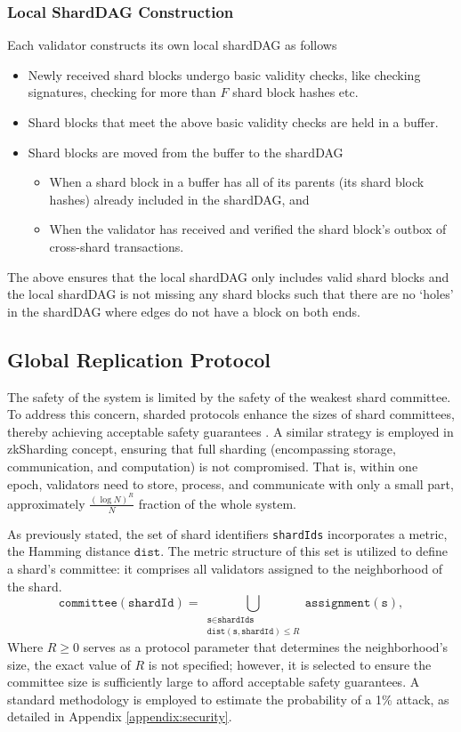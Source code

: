 \subsubsection{Local ShardDAG Construction}
Each validator constructs its own local shardDAG as follows
\begin{itemize}
	\item Newly received shard blocks undergo basic validity checks, like checking signatures, checking for more than $F$ shard block hashes etc.
	\item Shard blocks that meet the above basic validity checks are held in a buffer.
	\item Shard blocks are moved from the buffer to the shardDAG 
	\begin{itemize}
		\item When a shard block in a buffer has all of its parents (its shard block hashes) already included in the shardDAG, and 
		\item When the validator has received and verified the shard block's outbox of cross-shard transactions.	
	\end{itemize}
\end{itemize} 
The above ensures that the local shardDAG only includes valid shard blocks and the local shardDAG is not missing any shard blocks such that there are no `holes' in the shardDAG where edges do not have a block on both ends.





\subsection{Global Replication Protocol}
\label{section:global-consensus}

The safety of the system is limited by the safety of the weakest shard committee. 
To address this concern, sharded protocols enhance the sizes of shard committees, 
 thereby achieving acceptable safety guarantees \cite{RapidChain,OmniLedger}.
A similar strategy is employed in zkSharding concept, ensuring that full sharding (encompassing storage, communication, and computation) is not compromised.
That is, within one epoch, validators need to store, process,
 and communicate with only a small part, approximately $\frac{(\log N)^R}{N}$ fraction of the whole system.

As previously stated, the set of shard identifiers \texttt{shardIds} incorporates a metric, 
 the Hamming distance $\texttt{dist}$.
The metric structure of this set is utilized to define a shard's committee: 
 it comprises all validators assigned to the neighborhood of the shard.
$$
\texttt{committee}(\texttt{shardId}) = \bigcup_{
\substack{
\texttt{s} \in \texttt{shardIds}\\
\texttt{dist}(\texttt{s}, \texttt{shardId}) \leq R}}
\texttt{assignment}(\texttt{s}),
$$
Where $R \geq 0$ serves as a protocol parameter that determines the neighborhood's size, 
 the exact value of $R$ is not specified; 
 however, it is selected to ensure the committee size is sufficiently large to afford acceptable safety guarantees.
A standard methodology is employed to estimate the probability of a 1\% attack,
 as detailed in Appendix \ref{appendix:security}.

